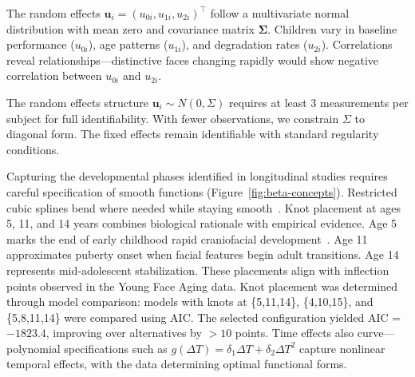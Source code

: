 \documentclass[10pt,journal,compsoc]{IEEEtran}
\begin{document}
The random effects $\mathbf{u}_i = (u_{0i}, u_{1i}, u_{2i})^\top$ follow a multivariate normal distribution with mean zero and covariance matrix $\mathbf{\Sigma}$. Children vary in baseline performance ($u_{0i}$), age patterns ($u_{1i}$), and degradation rates ($u_{2i}$). Correlations reveal relationships---distinctive faces changing rapidly would show negative correlation between $u_{0i}$ and $u_{2i}$.

The random effects structure $\mathbf{u}_i \sim N(0, \Sigma)$ requires at least 3 measurements per subject for full identifiability. With fewer observations, we constrain $\Sigma$ to diagonal form. The fixed effects remain identifiable with standard regularity conditions.

Capturing the developmental phases identified in longitudinal studies requires careful specification of smooth functions (Figure~\ref{fig:beta-concepts}). Restricted cubic splines bend where needed while staying smooth~\cite{harrell2015}. Knot placement at ages 5, 11, and 14 years combines biological rationale with empirical evidence. Age 5 marks the end of early childhood rapid craniofacial development~\cite{farkas1994}. Age 11 approximates puberty onset when facial features begin adult transitions. Age 14 represents mid-adolescent stabilization. These placements align with inflection points observed in the Young Face Aging data. Knot placement was determined through model comparison: models with knots at \{5,11,14\}, \{4,10,15\}, and \{5,8,11,14\} were compared using AIC. The selected configuration yielded AIC = $-1823.4$, improving over alternatives by $>10$ points. Time effects also curve---polynomial specifications such as $g(\Delta T) = \delta_1 \Delta T + \delta_2 \Delta T^2$ capture nonlinear temporal effects, with the data determining optimal functional forms.
\end{document}
